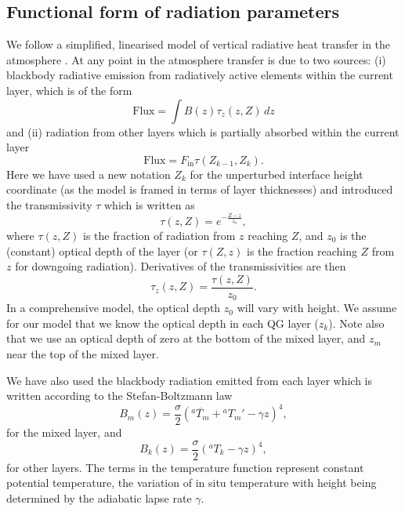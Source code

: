\documentclass[11pt, a4paper,twoside]{article}
\newcommand{\T}[2]{{{}^{#1}T_{#2}}}
\newcommand{\B}[1]{{B_{#1}}}
\numberwithin{equation}{section}
\begin{document}
\subsection{Functional form of radiation parameters}
We follow a simplified, linearised model of vertical radiative heat transfer in the atmosphere \citep[see][for details on the basics of radiative balance]{peixoto:92}.
At any point in the atmosphere transfer is due to two sources: (i)  blackbody radiative emission from radiatively active elements within the current layer, which is of the form
\[ \textrm{Flux} = \int B(z) \tau_z(z,Z) \, dz\]
and (ii) radiation from other layers which is partially absorbed within the current layer
\[ \textrm{Flux} = F_{\textrm{in}}\tau(Z_{k-1},Z_{k}).\]
Here we have used a new notation $Z_k$ for the unperturbed interface height coordinate (as the model is framed in terms of layer thicknesses) and introduced the transmissivity $\tau$ which is written as
\begin{equation}
\tau(z,Z) = e^{-\frac{Z-z}{z_0}},
\end{equation}
where $\tau(z,Z)$ is the fraction of radiation from $z$ reaching $Z$, and $z_0$ is the (constant) optical depth of the layer (or $\tau(Z,z)$ is the fraction reaching $Z$ from $z$ for downgoing radiation).
Derivatives of the transmissivities are then
\begin{equation}
\tau_z(z,Z) = \frac{\tau(z,Z)}{z_0}.
\end{equation}
In a comprehensive model, the optical depth $z_0$ will vary with height.
We assume for our model that we know the optical depth in each QG layer ($z_k$).
Note also that we use an optical depth of zero at the bottom of the mixed layer, and $z_m$ near the top of the mixed layer.

We have also used the blackbody radiation emitted from each layer which is written according to the Stefan-Boltzmann law
\begin{equation}
\B{m}(z) = \frac{\sigma}{2}(\overline{\T{a}{m}}  + \T{a}{m}' - \gamma z)^4,
\end{equation}
for the mixed layer, and
\begin{equation}
\B{k}(z) = \frac{\sigma}{2}(\T{a}{k} - \gamma z)^4,
\end{equation}
for other layers.
The terms in the temperature function represent constant potential temperature, the variation of in situ temperature with height being determined by the adiabatic lapse rate $\gamma$.
\end{document}
